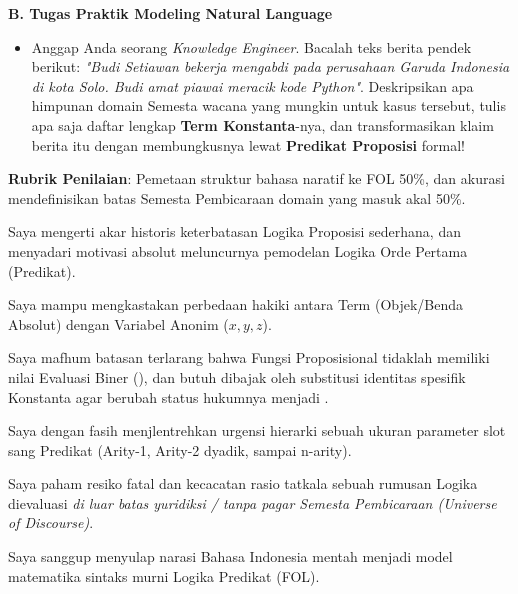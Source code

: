 \documentclass[../main]{subfiles}
\begin{document}
\begin{asesmen}
\textbf{B. Tugas Praktik Modeling Natural Language}
\begin{itemize}
  \item Anggap Anda seorang \textit{Knowledge Engineer}. Bacalah teks berita pendek berikut: \textit{"Budi Setiawan bekerja mengabdi pada perusahaan Garuda Indonesia di kota Solo. Budi amat piawai meracik kode Python"}. Deskripsikan apa himpunan domain Semesta wacana yang mungkin untuk kasus tersebut, tulis apa saja daftar lengkap \textbf{Term Konstanta}-nya, dan transformasikan klaim berita itu dengan membungkusnya lewat \textbf{Predikat Proposisi} formal!
\end{itemize}

\textbf{Rubrik Penilaian}: Pemetaan struktur bahasa naratif ke FOL 50\%, dan akurasi mendefinisikan batas Semesta Pembicaraan domain yang masuk akal 50\%.
\end{asesmen}


\begin{checklist}
  \item Saya mengerti akar historis keterbatasan Logika Proposisi sederhana, dan menyadari motivasi absolut meluncurnya pemodelan Logika Orde Pertama (Predikat).
  \item Saya mampu mengkastakan perbedaan hakiki antara Term (Objek/Benda Absolut) dengan Variabel Anonim ($x, y, z$).
  \item Saya mafhum batasan terlarang bahwa Fungsi Proposisional tidaklah memiliki nilai Evaluasi Biner (), dan butuh dibajak oleh substitusi identitas spesifik Konstanta agar berubah status hukumnya menjadi .
  \item Saya dengan fasih menjlentrehkan urgensi hierarki sebuah ukuran parameter slot sang Predikat (Arity-1, Arity-2 dyadik, sampai n-arity).
  \item Saya paham resiko fatal dan kecacatan rasio tatkala sebuah rumusan Logika dievaluasi \textit{di luar batas yuridiksi / tanpa pagar Semesta Pembicaraan (Universe of Discourse)}.
  \item Saya sanggup menyulap narasi Bahasa Indonesia mentah menjadi model matematika sintaks murni Logika Predikat (FOL).
\end{checklist}

\end{document}
